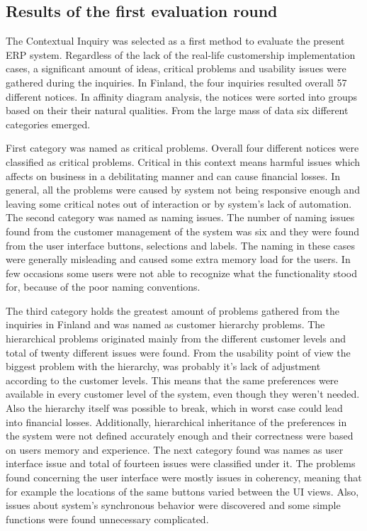 \documentclass[12pt,a4paper,oneside,pdftex]{report}
\begin{document}
\subsection{Results of the first evaluation round}

The Contextual Inquiry was selected as a first method to evaluate the present ERP system. Regardless of the lack of the real-life customership implementation cases, a significant amount of ideas, critical problems and usability issues were gathered during the inquiries. 
In Finland, the four inquiries resulted overall 57 different notices. In affinity diagram analysis, the notices were sorted into groups based on their their natural qualities. From the large mass of data six different categories emerged. 

First category was named as critical problems. Overall four different notices were classified as critical problems. Critical in this context means harmful issues which affects on business in a debilitating manner and can cause financial losses. In general, all the problems were caused by system not being responsive enough and leaving some critical notes out of interaction or by system's lack of automation. The second category was named as naming issues. The number of naming issues found from the customer management of the system was six and they were found from the user interface buttons, selections and labels. The naming in these cases were generally misleading and caused some extra memory load for the users. In few occasions some users were not able to recognize what the functionality stood for, because of the poor naming conventions. 

The third category holds the greatest amount of problems gathered from the inquiries in Finland and was named as customer hierarchy problems. The hierarchical problems originated mainly from the different customer levels and total of twenty different issues were found. From the usability point of view the biggest problem with the hierarchy, was probably it's lack of adjustment according to the customer levels. This means that the same preferences were available in every customer level of the system, even though they weren't needed. Also the hierarchy itself was possible to break, which in worst case could lead into financial losses. Additionally, hierarchical inheritance of the preferences in the system were not defined accurately enough and their correctness were based on users memory and experience. The next category found was names as user interface issue and total of fourteen issues were classified under it. The problems found concerning the user interface were mostly issues in coherency, meaning that for example the locations of the same buttons varied between the UI views. Also, issues about system's synchronous behavior were discovered and some simple functions were found unnecessary complicated.
\end{document}
